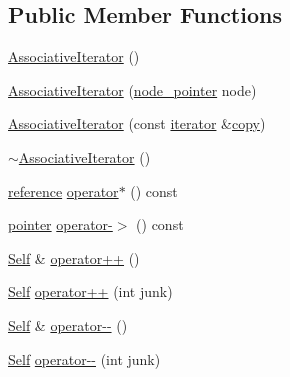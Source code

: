 \subsection*{Public Member Functions}
\begin{DoxyCompactItemize}
\item 
\hyperlink{structprism_1_1_associative_iterator_aa3820be28f7421449eb7334aa64a1c49}{Associative\+Iterator} ()
\item 
\hyperlink{structprism_1_1_associative_iterator_a5d1fcaa6ea1a58deb5802a58d9ebb8dc}{Associative\+Iterator} (\hyperlink{structprism_1_1_associative_iterator_a73a0ddce41b285bf48fb0ef3411f6557}{node\+\_\+pointer} node)
\item 
\hyperlink{structprism_1_1_associative_iterator_a152cedf6acccc8e4ad546a16447a442c}{Associative\+Iterator} (const \hyperlink{structprism_1_1_associative_iterator_a1c18ef8b4a02324bfdbf541b023ecc6b}{iterator} \&\hyperlink{namespaceprism_ae776f4cd825f79e7af1cf6ee1d90a209}{copy})
\item 
\hyperlink{structprism_1_1_associative_iterator_a24d17d692a4b78f0a8332449ab1ff99d}{$\sim$\+Associative\+Iterator} ()
\item 
\hyperlink{structprism_1_1_associative_iterator_a3e7953b18f39af18e7cac9b95c9709e7}{reference} \hyperlink{structprism_1_1_associative_iterator_a75187c65867cab0cfc187dcbc41456e9}{operator$\ast$} () const 
\item 
\hyperlink{structprism_1_1_associative_iterator_a50b40598e0da0364f809450010172dd2}{pointer} \hyperlink{structprism_1_1_associative_iterator_a64e845db1d51bd8cf83bae26a17f4bbb}{operator-\/$>$} () const 
\item 
\hyperlink{structprism_1_1_associative_iterator_acec023aedf7a8097250179b1de84d78d}{Self} \& \hyperlink{structprism_1_1_associative_iterator_a0930051edd8c13d9fd5b3f71f1e0f0ae}{operator++} ()
\item 
\hyperlink{structprism_1_1_associative_iterator_acec023aedf7a8097250179b1de84d78d}{Self} \hyperlink{structprism_1_1_associative_iterator_a781b8cbbbf43f0c5fe8abd63f36638c5}{operator++} (int junk)
\item 
\hyperlink{structprism_1_1_associative_iterator_acec023aedf7a8097250179b1de84d78d}{Self} \& \hyperlink{structprism_1_1_associative_iterator_a5954c73a236399a5faedfa27b1ae2118}{operator-\/-\/} ()
\item 
\hyperlink{structprism_1_1_associative_iterator_acec023aedf7a8097250179b1de84d78d}{Self} \hyperlink{structprism_1_1_associative_iterator_a061cedeb49bb827fd2594a8b9fb99d4e}{operator-\/-\/} (int junk)

\end{DoxyCompactItemize}
